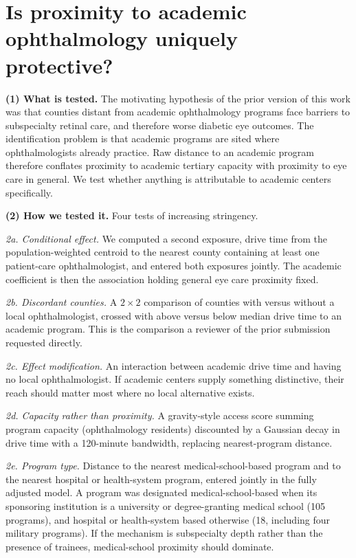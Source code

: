 \documentclass[11pt]{article}
\newcommand{\tpart}[1]{\medskip\noindent\textbf{#1}\quad}
\begin{document}
\section{Is proximity to academic ophthalmology uniquely protective?}

\tpart{(1) What is tested.}
The motivating hypothesis of the prior version of this work was that counties
distant from academic ophthalmology programs face barriers to subspecialty
retinal care, and therefore worse diabetic eye outcomes. The identification
problem is that academic programs are sited where ophthalmologists already
practice. Raw distance to an academic program therefore conflates proximity to
academic tertiary capacity with proximity to eye care in general. We test
whether anything is attributable to academic centers specifically.

\tpart{(2) How we tested it.}
Four tests of increasing stringency.

\emph{2a. Conditional effect.} We computed a second exposure, drive time from
the population-weighted centroid to the nearest county containing at least one
patient-care ophthalmologist, and entered both exposures jointly. The academic
coefficient is then the association holding general eye care proximity fixed.

\emph{2b. Discordant counties.} A $2\times2$ comparison of counties with versus
without a local ophthalmologist, crossed with above versus below median drive
time to an academic program. This is the comparison a reviewer of the prior
submission requested directly.

\emph{2c. Effect modification.} An interaction between academic drive time and
having no local ophthalmologist. If academic centers supply something
distinctive, their reach should matter most where no local alternative exists.

\emph{2d. Capacity rather than proximity.} A gravity-style access score summing
program capacity (ophthalmology residents) discounted by a Gaussian decay in
drive time with a 120-minute bandwidth, replacing nearest-program distance.

\emph{2e. Program type.} Distance to the nearest medical-school-based program
and to the nearest hospital or health-system program, entered jointly in the
fully adjusted model. A program was designated medical-school-based when its
sponsoring institution is a university or degree-granting medical school (105
programs), and hospital or health-system based otherwise (18, including four
military programs). If the mechanism is subspecialty depth rather than the
presence of trainees, medical-school proximity should dominate.
\end{document}
